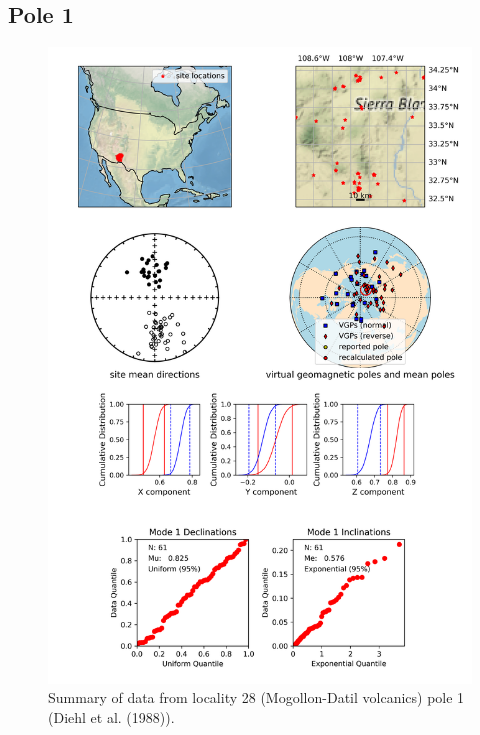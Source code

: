 \subsection{Pole 1}


\begin{figure}[H]
\centering
\includegraphics[width=5 in]{./28/1/pole_summary.png}
\caption{Summary of data from locality 28 (Mogollon-Datil volcanics) pole 1 (Diehl et al. (1988)).}
\end{figure}

